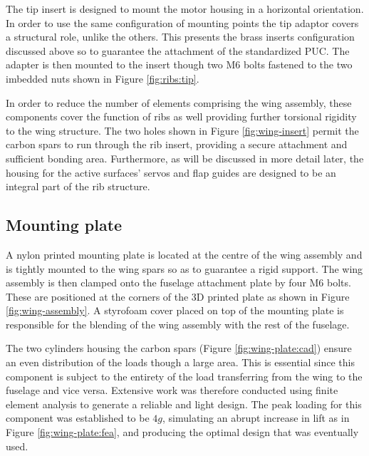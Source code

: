 \documentclass[../../main.tex]{subfiles}
\begin{document}

The tip insert is designed to mount the motor housing in a horizontal orientation.
In order to use the same configuration of mounting points the tip adaptor covers a structural role, unlike the others.
This presents the brass inserts configuration discussed above so to guarantee the attachment of the standardized PUC.  %
The adapter is then mounted to the insert though two M6 bolts fastened to the two imbedded nuts shown in Figure \ref{fig:ribs:tip}. 

In order to reduce the number of elements comprising the wing assembly, these components cover the function of ribs as well providing further torsional rigidity to the wing structure.
The two holes shown in Figure \ref{fig:wing-insert} permit the carbon spars to run through the rib insert, providing a secure attachment and sufficient bonding area.
Furthermore, as will be discussed in more detail later, the housing for the active surfaces' servos and flap guides are designed to be an integral part of the rib structure. 

\subsection{Mounting plate} \label{sec:final-design-proposal:wing:mounting-plate}

A nylon printed mounting plate is located at the centre of the wing assembly and is tightly mounted to the wing spars so as to guarantee a rigid support.
The wing assembly is then clamped onto the fuselage attachment plate by four M6 bolts.
These are positioned at the corners of the 3D printed plate as shown in Figure \ref{fig:wing-assembly}.
A styrofoam cover placed on top of the mounting plate is responsible for the blending of the wing assembly with the rest of the fuselage. 


The two cylinders housing the carbon spars (Figure \ref{fig:wing-plate:cad}) ensure an even distribution of the loads though a large area.
This is essential since this component is subject to the entirety of the load transferring from the wing to the fuselage and vice versa.
Extensive work was therefore conducted using finite element analysis to generate a reliable and light design.
The peak loading for this component was established to be $4g$, simulating an abrupt increase in lift as in Figure \ref{fig:wing-plate:fea}, and producing the optimal design that was eventually used. 
\end{document}
